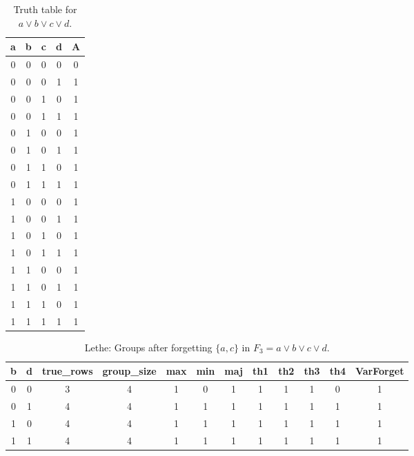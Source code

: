 \begin{table}[!tb]
    \centering
    \begin{tabular}{|c|c|c|c|c|}
        \hline
        \textbf{a} & \textbf{b} & \textbf{c} & \textbf{d} & \textbf{A} \\ \hline
        0 & 0 & 0 & 0 & 0 \\ \hline
        0 & 0 & 0 & 1 & 1 \\ \hline
        0 & 0 & 1 & 0 & 1 \\ \hline
        0 & 0 & 1 & 1 & 1 \\ \hline
        0 & 1 & 0 & 0 & 1 \\ \hline
        0 & 1 & 0 & 1 & 1 \\ \hline
        0 & 1 & 1 & 0 & 1 \\ \hline
        0 & 1 & 1 & 1 & 1 \\ \hline
        1 & 0 & 0 & 0 & 1 \\ \hline
        1 & 0 & 0 & 1 & 1 \\ \hline
        1 & 0 & 1 & 0 & 1 \\ \hline
        1 & 0 & 1 & 1 & 1 \\ \hline
        1 & 1 & 0 & 0 & 1 \\ \hline
        1 & 1 & 0 & 1 & 1 \\ \hline
        1 & 1 & 1 & 0 & 1 \\ \hline
        1 & 1 & 1 & 1 & 1 \\ \hline
    \end{tabular}
    \caption{Truth table for $a \lor b \lor c \lor d$.}
    \label{tab:truthtab}
\end{table}

\begin{table}[!tb]
    \centering
    \begin{tabular}{|c|c|c|c|c|c|c|c|c|c|c|c|}
        \hline
        \textbf{b} & \textbf{d} & \textbf{true\_rows} & \textbf{group\_size} & \textbf{max} & \textbf{min} & \textbf{maj} & \textbf{th1} & \textbf{th2} & \textbf{th3} & \textbf{th4} & \textbf{VarForget} \\ \hline
        \rowcolor{gray!40} 0 & 0 & 3 & 4 & 1 & 0 & 1 & 1 & 1 & 1 & 0 & 1 \\ \hline
        \rowcolor{blue!40} 0 & 1 & 4 & 4 & 1 & 1 & 1 & 1 & 1 & 1 & 1 & 1 \\ \hline
        \rowcolor{red!40} 1 & 0 & 4 & 4 & 1 & 1 & 1 & 1 & 1 & 1 & 1 & 1 \\ \hline
        \rowcolor{green!40} 1 & 1 & 4 & 4 & 1 & 1 & 1 & 1 & 1 & 1 & 1 & 1 \\ \hline
    \end{tabular}
    \caption{Lethe: Groups after forgetting $\{a, c\}$ in $F_{3} = a \lor b \lor c \lor d$.}
    \label{tab:lethe-F3-ac-groups}
\end{table}
